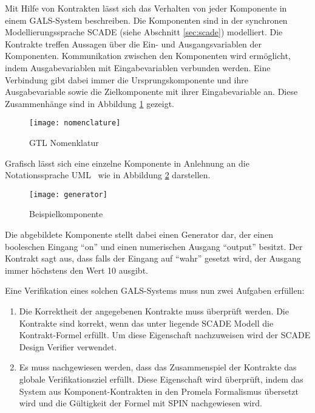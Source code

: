 Mit Hilfe von Kontrakten lässt sich das Verhalten von jeder Komponente in einem GALS-System beschreiben.
Die Komponenten sind in der synchronen Modellierungssprache SCADE (siehe Abschnitt \ref{sec:scade}) modelliert.
Die Kontrakte treffen Aussagen über die Ein- und Ausgangsvariablen der Komponenten.
Kommunikation zwischen den Komponenten wird ermöglicht, indem Ausgabevariablen mit Eingabevariablen verbunden werden.
Eine Verbindung gibt dabei immer die Ursprungskomponente und ihre Ausgabevariable sowie die Zielkomponente mit ihrer Eingabevariable an.
Diese Zusammenhänge sind in Abbildung \ref{fig:nomenclature} gezeigt.
\begin{figure}
  \centering
  \texttt{[image: nomenclature]}
  \caption{GTL Nomenklatur}
  \label{fig:nomenclature}
\end{figure}

Grafisch lässt sich eine einzelne Komponente in Anlehnung an die Notationssprache UML~\cite{uml} wie in Abbildung \ref{fig:example_generator} darstellen.
\begin{figure}
  \centering
  \texttt{[image: generator]}
  \caption{Beispielkomponente}
  \label{fig:example_generator}
\end{figure}
Die abgebildete Komponente stellt dabei einen Generator dar, der einen booleschen Eingang "`on"' und einen numerischen Ausgang "`output"' besitzt.
Der Kontrakt sagt aus, dass falls der Eingang auf "`wahr"' gesetzt wird, der Ausgang immer höchstens den Wert 10 ausgibt.

Eine Verifikation eines solchen GALS-Systems muss nun zwei Aufgaben erfüllen:
\begin{enumerate}
\item Die Korrektheit der angegebenen Kontrakte muss überprüft werden.
  Die Kontrakte sind korrekt, wenn das unter liegende SCADE Modell die Kontrakt-Formel erfüllt.
  Um diese Eigenschaft nachzuweisen wird der SCADE Design Verifier verwendet.
\item Es muss nachgewiesen werden, dass das Zusammenspiel der Kontrakte das globale Verifikationsziel erfüllt.
  Diese Eigenschaft wird überprüft, indem das System aus Komponent-Kontrakten in den Promela Formalismus übersetzt wird und die Gültigkeit der Formel mit SPIN nachgewiesen wird.
\end{enumerate}
